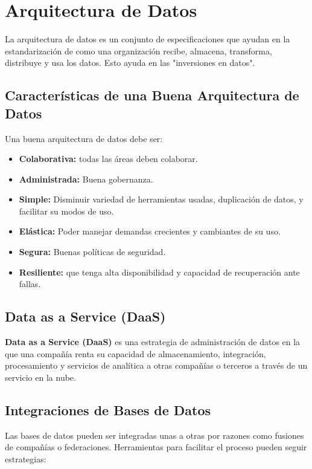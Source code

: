 \section*{Arquitectura de Datos}

La arquitectura de datos es un conjunto de especificaciones que ayudan en la estandarización de como una organización recibe, almacena, transforma, distribuye y usa los datos. Esto ayuda en las "inversiones en datos".

\subsection*{Características de una Buena Arquitectura de Datos}

Una buena arquitectura de datos debe ser:

\begin{itemize}
    \item \textbf{Colaborativa:} todas las áreas deben colaborar.
    \item \textbf{Administrada:} Buena gobernanza.
    \item \textbf{Simple:} Disminuir variedad de herramientas usadas, duplicación de datos, y facilitar su modos de uso.
    \item \textbf{Elástica:} Poder manejar demandas crecientes y cambiantes de su uso.
    \item \textbf{Segura:} Buenas políticas de seguridad.
    \item \textbf{Resiliente:} que tenga alta disponibilidad y capacidad de recuperación ante fallas.
\end{itemize}
\textbf{}

\subsection*{Data as a Service (DaaS)}

\textbf{Data as a Service (DaaS)} es una estrategia de administración de datos en la que una compañía renta su capacidad de almacenamiento, integración, procesamiento y servicios de analítica a otras compañías o terceros a través de un servicio en la nube.

\subsection*{Integraciones de Bases de Datos}

Las bases de datos pueden ser integradas unas a otras por razones como fusiones de compañías o federaciones. Herramientas para facilitar el proceso pueden  seguir estrategias:

